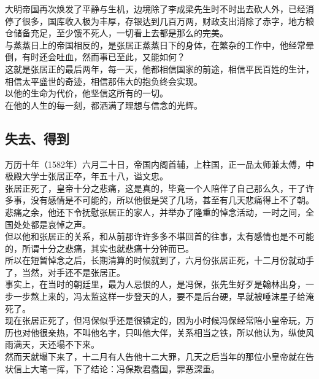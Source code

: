 \begin{multicols}{\theparacolNo}
大明帝国再次焕发了平静与生机，边境除了李成梁先生时不时出去砍人外，已经消停了很多，国库收入极为丰厚，存银达到几百万两，财政支出消除了赤字，地方粮仓储备充足，至少饿不死人，一切看上去都是那么的完美。\\

与蒸蒸日上的帝国相反的，是张居正蒸蒸日下的身体，在繁杂的工作中，他经常晕倒，有时还会吐血，然而事已至此，又能如何？\\

这就是张居正的最后两年，每一天，他都相信国家的前途，相信平民百姓的生计，相信太平盛世的奇迹，相信那伟大的抱负终会实现。\\

以他的生命为代价，他坚信这所有的一切。\\

在他的人生的每一刻，都洒满了理想与信念的光辉。\\

\subsection{失去、得到}
万历十年（1582年）六月二十日，帝国内阁首辅，上柱国，正一品太师兼太傅，中极殿大学士张居正卒，年五十八，谥文忠。\\

张居正死了，皇帝十分之悲痛，这是真的，毕竟一个人陪伴了自己那么久，干了许多事，没有感情是不可能的，所以他很是哭了几场，甚至有几天悲痛得上不了朝。\\

悲痛之余，他还下令抚慰张居正的家人，并举办了隆重的悼念活动，一时之间，全国处处都是哀悼之声。\\

但以他和张居正的关系，和从前那许许多多不堪回首的往事，太有感情也是不可能的，所谓十分之悲痛，其实也就悲痛十分钟而已。\\

所以在短暂悼念之后，长期清算的时候就到了，六月份张居正死，十二月份就动手了，当然，对手还不是张居正。\\

事实上，在当时的朝廷里，最为人忌恨的人，是冯保，张先生好歹是翰林出身，一步一步熬上来的，冯太监这样一步登天的人，要不是后台硬，早就被唾沫星子给淹死了。\\

现在张居正死了，但冯保似乎还是很镇定的，因为小时候冯保经常陪小皇帝玩，万历也对他很亲热，不叫他名字，只叫他大伴，关系相当之铁，所以他认为，纵使风雨满天，天还塌不下来。\\

然而天就塌下来了，十二月有人告他十二大罪，几天之后当年的那位小皇帝就在告状信上大笔一挥，下了结论：冯保欺君蠹国，罪恶深重。\\


\end{multicols}
